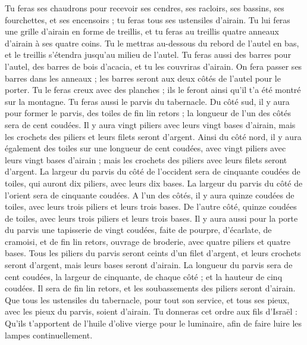 \begin{multicols}{2}
Tu feras ses chaudrons pour recevoir ses cendres, ses racloirs, ses bassins, ses fourchettes, et ses encensoirs ; tu feras tous ses ustensiles d'airain.
Tu lui feras une grille d'airain en forme de treillis, et tu feras au treillis quatre anneaux d'airain à ses quatre coins.
Tu le mettras au-dessous du rebord de l'autel en bas, et le treillis s'étendra jusqu'au milieu de l'autel.
Tu feras aussi des barres pour l'autel, des barres de bois d’acacia, et tu les couvriras d'airain.
On fera passer ses barres dans les anneaux ; les barres seront aux deux côtés de l'autel pour le porter.
Tu le feras creux avec des planches ; ils le feront ainsi qu'il t'a été montré sur la montagne.
Tu feras aussi le parvis du tabernacle. Du côté sud, il y aura pour former le parvis, des toiles de fin lin retors ; la longueur de l'un des côtés sera de cent coudées.
Il y aura vingt piliers avec leurs vingt bases d'airain, mais les crochets des piliers et leurs filets seront d'argent.
Ainsi du côté nord, il y aura également des toiles sur une longueur de cent coudées, avec vingt piliers avec leurs vingt bases d'airain ; mais les crochets des piliers avec leurs filets seront d'argent.
La largeur du parvis du côté de l'occident sera de cinquante coudées de toiles, qui auront dix piliers, avec leurs dix bases.
La largeur du parvis du côté de l'orient sera de cinquante coudées.
A l'un des côtés, il y aura quinze coudées de toiles, avec leurs trois piliers et leurs trois bases.
De l'autre côté, quinze coudées de toiles, avec leurs trois piliers et leurs trois bases.
Il y aura aussi pour la porte du parvis une tapisserie de vingt coudées, faite de pourpre, d'écarlate, de cramoisi, et de fin lin retors, ouvrage de broderie, avec quatre piliers et quatre bases.
Tous les piliers du parvis seront ceints d'un filet d'argent, et leurs crochets seront d'argent, mais leurs bases seront d'airain.
La longueur du parvis sera de cent coudées, la largeur de cinquante, de chaque côté ; et la hauteur de cinq coudées. Il sera de fin lin retors, et les soubassements des piliers seront d'airain.
Que tous les ustensiles du tabernacle, pour tout son service, et tous ses pieux, avec les pieux du parvis, soient d'airain.
Tu donneras cet ordre aux fils d'Israël : Qu'ils t'apportent de l'huile d'olive vierge pour le luminaire, afin de faire luire les lampes continuellement.

\end{multicols}
